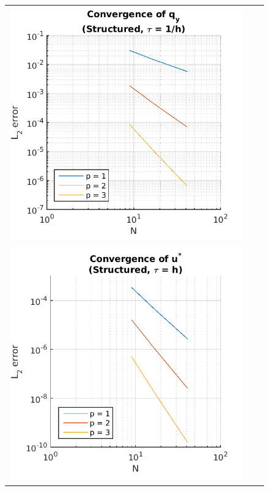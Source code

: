 \documentclass{article}
\begin{document}
\begin{figure}
\begin{tabular}{c c c}
\includegraphics[scale=0.5]{csqy_3.png} \\
\includegraphics[scale=0.5]{cspp_1.png} & 

\end{tabular}
\end{figure}
\end{document}

